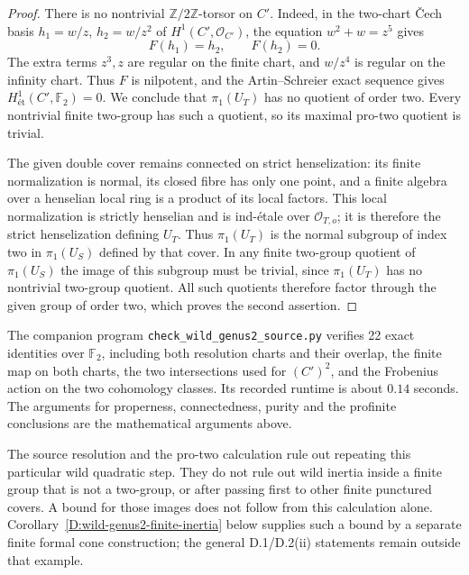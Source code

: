 \begin{proof}
There is no nontrivial \(\mathbb Z/2\mathbb Z\)-torsor on
$C'$.  Indeed, in the two-chart \v Cech basis
$h_1=w/z$, $h_2=w/z^2$ of $H^1(C',\mathcal O_{C'})$,
the equation $w^2+w=z^5$ gives
\[
                              F(h_1)=h_2,\qquad F(h_2)=0.
\]
The extra terms $z^3,z$ are regular on the finite chart,
and $w/z^4$ is regular on the infinity chart.  Thus $F$
is nilpotent, and the Artin--Schreier exact sequence gives
$H^1_{\text{ét}}(C',\mathbb F_2)=0$.  We conclude
that $\pi_1(U_T)$ has no quotient of order two.  Every
nontrivial finite two-group has such a quotient, so its
maximal pro-two quotient is trivial.

The given double cover remains connected on strict
henselization: its finite normalization is normal, its
closed fibre has only one point, and a finite algebra over
a henselian local ring is a product of its local factors.
This local normalization is strictly henselian and is
ind-\'etale over $\mathcal O_{T,o}$; it is therefore
the strict henselization defining $U_T$.
Thus $\pi_1(U_T)$ is the normal subgroup of index two in
$\pi_1(U_S)$ defined by that cover.  In any finite
two-group quotient of $\pi_1(U_S)$ the image of this
subgroup must be trivial, since $\pi_1(U_T)$ has no
nontrivial two-group quotient.  All such quotients
therefore factor through the given group of order two,
which proves the second assertion.
\end{proof}

\begin{remark}
The companion program
\texttt{check\_wild\_genus2\_source.py} verifies 22 exact
identities over $\mathbb F_2$, including both resolution
charts and their overlap, the finite map on both charts,
the two intersections used for $(C')^2$, and the
Frobenius action on the two cohomology classes.  Its
recorded runtime is about $0.14$ seconds.  The arguments
for properness, connectedness, purity and the profinite
conclusions are the mathematical arguments above.
\end{remark}

\begin{remark}
The source resolution and the pro-two calculation rule out
repeating this particular wild quadratic step.  They do
not rule out wild inertia inside a finite group that is
not a two-group, or after passing first to other finite
punctured covers.  A bound for those images does not follow from this calculation
alone.  Corollary~\ref{D:wild-genus2-finite-inertia} below supplies
such a bound by a separate finite formal cone construction;
the general D.1/D.2(ii) statements remain outside that example.
\end{remark}
